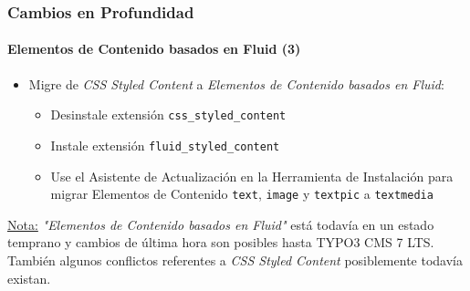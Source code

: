 \begin{frame}[fragile]
	\frametitle{Cambios en Profundidad}
	\framesubtitle{Elementos de Contenido basados en Fluid (3)}

	\begin{itemize}

		\item Migre de \textit{CSS Styled Content} a \textit{Elementos de Contenido basados en Fluid}:

			\begin{itemize}

				\item Desinstale extensión \texttt{css\_styled\_content}

				\item Instale extensión \texttt{fluid\_styled\_content}

				\item Use el Asistente de Actualización en la Herramienta de Instalación para migrar Elementos de Contenido
					\texttt{text}, \texttt{image} y \texttt{textpic} a \texttt{textmedia}

			\end{itemize}
	\end{itemize}

	\vspace{1.4cm}

	\begingroup
		\color{red}
			\small
				\underline{Nota:} \textit{"Elementos de Contenido basados en Fluid"} está todavía en un estado temprano
				y cambios de última hora son posibles hasta TYPO3 CMS 7 LTS.
				También algunos conflictos referentes a \textit{CSS Styled Content} posiblemente todavía existan.
			\normalsize
	\endgroup

\end{frame}



